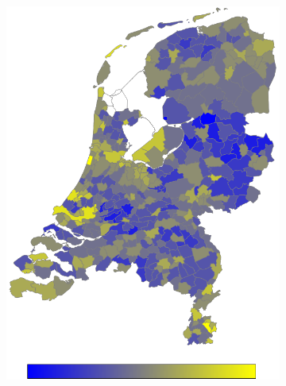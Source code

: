 \documentclass[a4paper,twoside,11pt]{article}
\begin{document}
\begin{figure}[h]
\begin{subfigure}[b]{0.118\textwidth}
                \includegraphics[width=\textwidth]{Heatmaps/HeatMap15.png}
                \caption{}
                \label{fig:Divorced}
        \end{subfigure}
        \begin{subfigure}[b]{0.118\textwidth}

\end{subfigure}
\end{figure}
\end{document}

